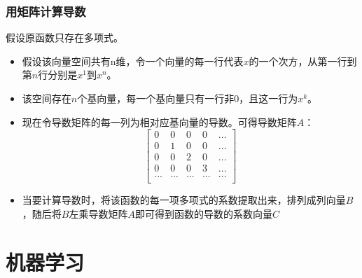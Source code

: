 \documentclass[UTF8]{ctexart}
\begin{document}
\subsubsection{用矩阵计算导数}
假设原函数只存在多项式。
\begin{itemize}
	\item 假设该向量空间共有n维，令一个向量的每一行代表$x$的一个次方，从第一行到第$n$行分别是$x^1$到$x^n$。
	\item 该空间存在$n$个基向量，每一个基向量只有一行非0，且这一行为$x^k$。
	\item 现在令导数矩阵的每一列为相对应基向量的导数。可得导数矩阵$A$：$$\begin{bmatrix}
		0 & 0 & 0 & 0 & ... \\
		0 & 1 & 0 & 0 & ... \\
		0 & 0 & 2 & 0 & ... \\
		0 & 0 & 0 & 3 & ... \\
		... & ... & ... & ... & ... \\
	\end{bmatrix}$$
	\item 当要计算导数时，将该函数的每一项多项式的系数提取出来，排列成列向量$B$，随后将$B$左乘导数矩阵$A$即可得到函数的导数的系数向量$C$
\end{itemize}


\newpage
\section{机器学习}
\end{document}
